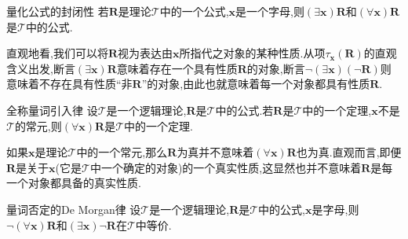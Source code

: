 \begin{metatheorem}{量化公式的封闭性}{}
	若$\boldsymbol{R}$是理论$\mathcal{T}$中的一个公式,$\boldsymbol{x}$是一个字母,则$\left(\exists\boldsymbol{x}\right)\boldsymbol{R}$和$\left(\forall\boldsymbol{x}\right)\boldsymbol{R}$是$\mathcal{T}$中的公式.
\end{metatheorem}

\begin{remark}{}{}
	直观地看,我们可以将$\boldsymbol{R}$视为表达由$\boldsymbol{x}$所指代之对象的某种性质.从项$\tau_{\boldsymbol{x}}\left(\boldsymbol{R}\right)$的直观含义出发,断言$\left(\exists\boldsymbol{x}\right)\boldsymbol{R}$意味着存在一个具有性质$\boldsymbol{R}$的对象,断言$\neg\left(\exists\boldsymbol{x}\right)\left(\neg\boldsymbol{R}\right)$则意味着不存在具有性质``非$\boldsymbol{R}$''的对象,由此也就意味着每一个对象都具有性质$\boldsymbol{R}$.
\end{remark}

\begin{metatheorem}{全称量词引入律}{}
	设$\mathcal{T}$是一个逻辑理论,$\boldsymbol{R}$是$\mathcal{T}$中的公式.若$\boldsymbol{R}$是$\mathcal{T}$中的一个定理,$\boldsymbol{x}$不是$\mathcal{T}$的常元,则$\left(\forall\boldsymbol{x}\right)\boldsymbol{R}$是$\mathcal{T}$中的一个定理.
\end{metatheorem}

\begin{remark}{}{}
	如果$\boldsymbol{x}$是理论$\mathcal{T}$中的一个常元,那么$\boldsymbol{R}$为真并不意味着$\left(\forall\boldsymbol{x}\right)\boldsymbol{R}$也为真.直观而言,即便$\boldsymbol{R}$是关于$\boldsymbol{x}$(它是$\mathcal{T}$中一个确定的对象)的一个真实性质,这显然也并不意味着$\boldsymbol{R}$是每一个对象都具备的真实性质.
\end{remark}

\begin{metatheorem}{量词否定的De Morgan律}{}
	设$\mathcal{T}$是一个逻辑理论,$\boldsymbol{R}$是$\mathcal{T}$中的公式,$\boldsymbol{x}$是字母,则$\neg\left(\forall\boldsymbol{x}\right)\boldsymbol{R}$和$\left(\exists\boldsymbol{x}\right)\neg\boldsymbol{R}$在$\mathcal{T}$中等价.
\end{metatheorem}
